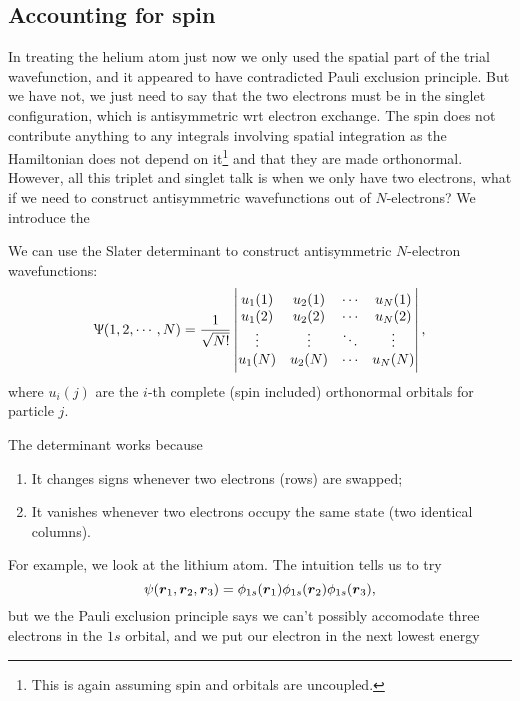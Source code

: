 \subsection{Accounting for spin}
\label{acc_for_spin}
In treating the helium atom just now we only used the spatial part of the trial 
wavefunction, and it appeared to have contradicted Pauli exclusion principle. 
But we have not, we just need to say that the two electrons must be in the 
singlet configuration, which is antisymmetric wrt electron exchange. The spin 
does not contribute anything to any integrals involving spatial integration 
as the Hamiltonian does not depend on it\footnote{This is again assuming spin and 
orbitals are uncoupled.} and that they are made orthonormal. \\
However, all this triplet and singlet talk is when we only have two electrons, 
what if we need to construct antisymmetric wavefunctions out of $N$-electrons? 
We introduce the 
\begin{defi}
We can use the Slater determinant to construct antisymmetric $N$-electron wavefunctions:
\begin{equation}
\Uppsi(1,2,\cdots,N)=\frac{1}{\sqrt{N!}}
\begin{vmatrix}
u_1(1)&u_2(1)&\cdots&u_N(1)\\
u_1(2)&u_2(2)&\cdots&u_N(2)\\
\vdots&\vdots&\ddots&\vdots\\
u_1(N)&u_2(N)&\cdots&u_N(N)
\end{vmatrix}, 
\end{equation}
where $u_i(j)$ are the $i$-th complete (\ie spin included) orthonormal orbitals 
for particle $j$. 
\end{defi} 
The determinant works because
\begin{enumerate}
	\item It changes signs whenever two electrons (rows) are swapped; 
	\item It vanishes whenever two electrons occupy the same state (two identical columns). 
\end{enumerate}
For example, we look at the lithium atom. The intuition tells us to try 
\begin{equation}
\psi(\boldsymbol{r}_1,\boldsymbol{r}_2,\boldsymbol{r}_3)=\phi_{1s}(\boldsymbol{r}_1)\phi_{1s}(\boldsymbol{r}_2)\phi_{1s}(\boldsymbol{r}_3), 
\end{equation}
but we the Pauli exclusion principle says we can't possibly accomodate three 
electrons in the $1s$ orbital, and we put our electron in the next lowest energy 
